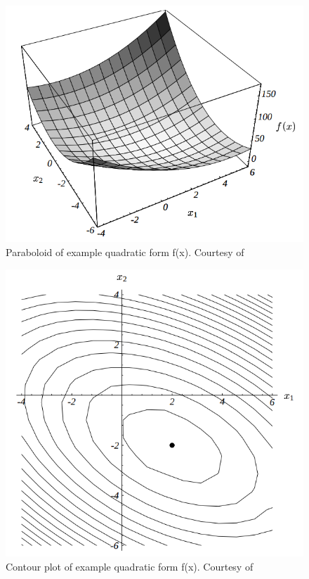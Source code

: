 \documentclass[en]{minipw} %
\begin{document}
\begin{figure}[h!]
\centering
\includegraphics[scale=0.5]{pictures/paraboloid.png}
\caption[Paraboloid of quadratic form]{Paraboloid of example quadratic form f(x). Courtesy of~\cite{cg}}
\end{figure}

\begin{figure}[h!]
\centering
\includegraphics[scale=0.5]{pictures/contour.png}
\caption[Contour plot of quadratic form]{Contour plot of example quadratic form f(x). Courtesy of~\cite{cg}}
\end{figure}
\end{document}
